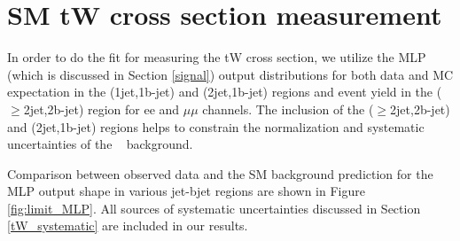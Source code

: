\clearpage
\section{SM tW cross section measurement}
\label{App_tW_XS}

In order to do the fit for measuring the tW cross section, we utilize the MLP (which is discussed in Section \ref{signal}) output distributions for both data and MC expectation in the (1jet,1b-jet) and (2jet,1b-jet) regions and event yield in the ($\geq$2jet,2b-jet) region for ee and $\mu\mu$ channels. The inclusion of the ($\geq$2jet,2b-jet) and (2jet,1b-jet) regions helps to constrain the normalization and systematic uncertainties of the \ttbar~ background.

Comparison between observed data and the SM background prediction for the MLP output shape in various jet-bjet regions are shown in Figure \ref{fig:limit_MLP}.
All sources of systematic uncertainties discussed in Section \ref{tW_systematic} are included in our results.

